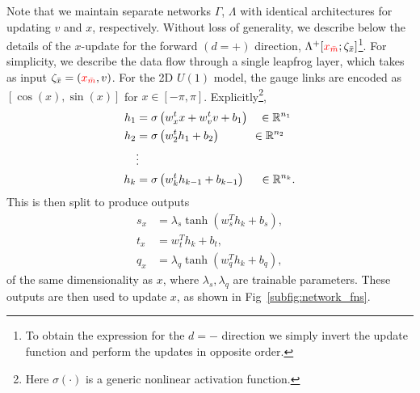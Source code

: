 \documentclass[a4paper,11pt]{article}
\newcommand{\xmaskbar}{\textcolor{red}{x_{\bar{m}}}}
\begin{document}
Note that we maintain separate networks \(\Gamma\), \(\Lambda\) with
identical architectures for updating \(v\) and \(x\), respectively.
%
Without loss of generality, we describe below the details of the \(x\)-update
for the forward \((d = +)\) direction, \(\Lambda^{+}[\xmaskbar;
\zeta_{\bar{x}}]\)\footnote{
    To obtain the expression for the \(d=-\) direction we simply invert the
    update function and perform the updates in opposite order.
}.
%
For simplicity, we describe the data flow through a single leapfrog layer,
%
which takes as input \(\zeta_{\bar{x}} = (\xmaskbar, v)\). For the 2D \(U(1)\)
model, the gauge links are encoded as \([\cos(x), \sin(x)]\) for \(x \in [-\pi,
\pi]\).
%
Explicitly\footnote{
    Here \(\sigma(\cdot)\) is a generic nonlinear activation function.
},
%
\begin{align}
    h_{1} &= \sigma\left(w_{x}^{t} x + w_{v}^{t} v + b_{1}\right)
        \quad \in \mathbb{R}^{n_{1}} \\
    h_{2} &= \sigma\left(w_{2}^{t} h_{1} + b_{2}\right)
        \hspace{0.085\textwidth} \in \mathbb{R}^{n_{2}} \\
    \nonumber& \vdots\\
    h_{k} &= \sigma\left(w_{k}^{t} h_{k-1} + b_{k-1}\right)
        \hspace{0.04\textwidth} \in \mathbb{R}^{n_{k}}.
\end{align}
%
This is then split to produce outputs
%
\begin{align}
    s_{x} &= \lambda_{s} \tanh \left( w^{T}_{s} h_{k} + b_{s} \right), \\
    t_{x} &= w^{T}_{t} h_{k} + b_{t}, \\
    q_{x} &= \lambda_{q}\tanh\left(w^{T}_{q} h_{k} + b_{q}\right),
    \label{eq:net_outputs}
\end{align}
%
of the same dimensionality as \(x\), where \(\lambda_{s}, \lambda_{q}\) are
trainable parameters.
%
These outputs are then used to update \(x\), as shown in
Fig~\ref{subfig:network_fns}.
\end{document}

